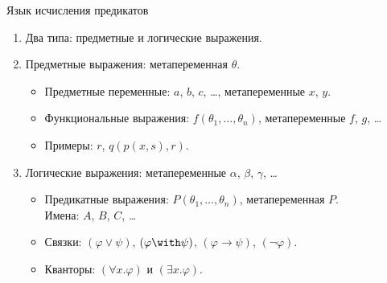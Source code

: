 \documentclass[aspectratio=169]{beamer}
\begin{document}
\begin{frame}{Язык исчисления предикатов}
\begin{enumerate}
\item Два типа: предметные и логические выражения. \pause
\item Предметные выражения: метапеременная {\color{blue}$\theta$}. \pause
\begin{itemize}
\item Предметные переменные: {\color{blue}$a$}, {\color{blue}$b$}, {\color{blue}$c$}, \dots, метапеременные {\color{blue}$x$}, {\color{blue}$y$}. \pause
\item Функциональные выражения: {\color{blue}$f(\theta_1,\dots,\theta_n)$}, метапеременные {\color{blue}$f$}, {\color{blue}$g$}, \dots\\\pause
\item Примеры: %
  {\color{blue}$r$},
  {\color{blue}$q(p(x,s),r)$}.
\end{itemize}\pause
\item Логические выражения: метапеременные {\color{blue}$\alpha$}, {\color{blue}$\beta$}, {\color{blue}$\gamma$}, \dots
\begin{itemize}
\item Предикатные выражения: {\color{blue}$P(\theta_1,\dots,\theta_n)$}, метапеременная {\color{blue}$P$}.\\\pause
Имена: {\color{blue}$A$}, {\color{blue}$B$}, {\color{blue}$C$}, \dots \pause %
\item Связки: {\color{blue}$(\varphi\vee\psi)$}, {\color{blue}$(\varphi\with\psi)$}, {\color{blue}$(\varphi\rightarrow\psi)$}, 
   {\color{blue}$(\neg\varphi)$}.\pause
\item Кванторы: {\color{blue}$(\forall x.\varphi)$} и {\color{blue}$(\exists x.\varphi)$}.
\end{itemize}
\end{enumerate}
\end{frame}
\end{document}
